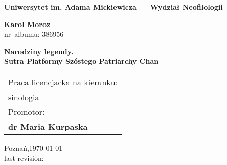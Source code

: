 \begin{titlepage}%
  \begin{center}%
    {\large \textbf{Uniwersytet im. Adama Mickiewicza --- Wydział Neofilologii}\par}
    \par
  \end{center}%
   \vspace{1cm plus 1fill}
  \begin{flushleft}%
    {{\Large\bfseries Karol Moroz}\\
    nr~albumu: 386956\par}
  \end{flushleft}%
   \vspace{8mm plus 1mm minus 2mm}
  \begin{center}%
    {\huge\textbf{Narodziny legendy.\\Sutra Platformy Szóstego Patriarchy Chan}\par}
    \vspace{2cm plus 1.5fill}
    \begin{flushright}\large
      \begin{tabular}{l}
        Praca licencjacka na kierunku:\\[3pt]
        sinologia\\[3pt]
        Promotor: \\[3pt]
        \bfseries dr Maria Kurpaska
      \end{tabular}
    \end{flushright}
    \vspace{15mm plus .1fill}
    {\large Poznań,\space \today\\last revision: \par}
  \end{center}
\end{titlepage}%
